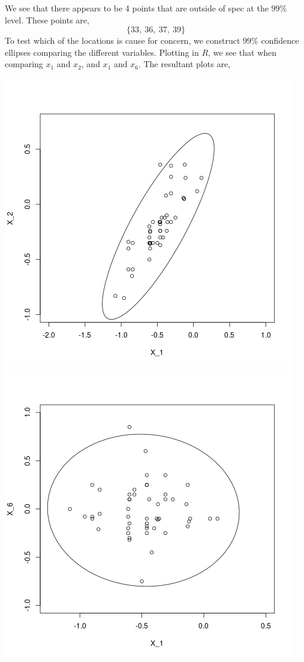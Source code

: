 \documentclass[letterpaper,10pt]{article}
\begin{document}
\begin{enumerate}
\begin{center}
\end{center}
We see that there appears to be 4 points that are outside of spec at the $99\%$ level. These points are,
\[\{33,\ 36,\ 37,\ 39\}\]
To test which of the locations is cause for concern, we construct $99\%$ confidence ellipses comparing the different variables. Plotting in $R$, we see that when comparing $x_1$ and $x_2$, and $x_1$ and $x_6$. The resultant plots are,
\begin{center}
\includegraphics[scale=.7]{12.png}
\includegraphics[scale=.7]{16.png}

\end{center}
\end{enumerate}
\end{document}
